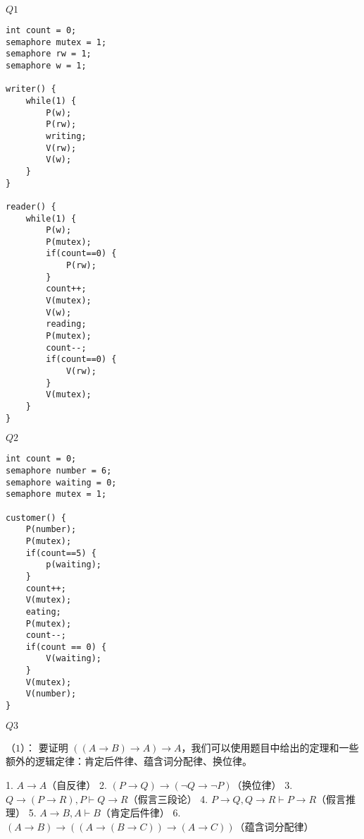\documentclass{article}
\begin{document}


{\LARGE $Q1$}
\lstset{language=C}
\begin{lstlisting}
int count = 0;
semaphore mutex = 1;
semaphore rw = 1;
semaphore w = 1;

writer() {
	while(1) {
		P(w);
		P(rw);
		writing;
		V(rw);
		V(w);
	}
}

reader() {
	while(1) {
		P(w);
		P(mutex);
		if(count==0) {
			P(rw);
		}
		count++;
		V(mutex);
		V(w);
		reading;
		P(mutex);
		count--;
		if(count==0) {
			V(rw);
		}
		V(mutex);
	}
}
\end{lstlisting}

{\LARGE $Q2$}
\lstset{language=C}
\begin{lstlisting}
int count = 0;
semaphore number = 6;
semaphore waiting = 0;
semaphore mutex = 1;

customer() {
	P(number);
	P(mutex);
	if(count==5) {
		p(waiting);
	}
	count++;
	V(mutex);
	eating;
	P(mutex);
	count--;
	if(count == 0) {
		V(waiting);
	}
	V(mutex);
	V(number);
}
\end{lstlisting}
	
{\LARGE $Q3$}

{\large （$1$）：}
要证明 \(((A \to B) \to A) \to A\)，我们可以使用题目中给出的定理和一些额外的逻辑定律：肯定后件律、蕴含词分配律、换位律。

1. \( A \to A \)（自反律）
2. \((P \to Q) \to (\neg Q \to \neg P)\)（换位律）
3. \( Q \to (P \to R), P \vdash Q \to R \)（假言三段论）
4. \( P \to Q, Q \to R \vdash P \to R \)（假言推理）
5. \( A \to B, A \vdash B \)（肯定后件律）
6. \( (A \to B) \to ((A \to (B \to C)) \to (A \to C)) \)（蕴含词分配律）
\end{document}
